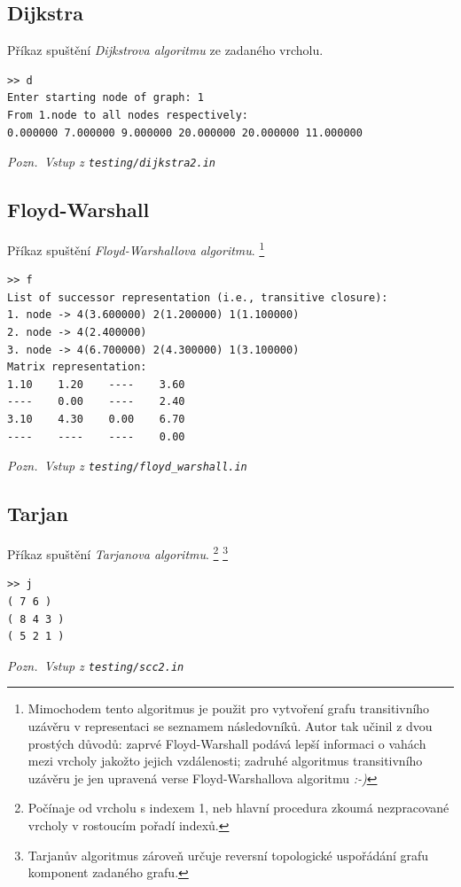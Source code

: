 \documentclass[11pt,a4paper]{article}
\begin{document}
\subsection{Dijkstra}
Příkaz spuštění {\sl Dijkstrova algoritmu\/} ze zadaného vrcholu.

\begin{verbatim}
>> d
Enter starting node of graph: 1
From 1.node to all nodes respectively:
0.000000 7.000000 9.000000 20.000000 20.000000 11.000000 
\end{verbatim}

{\noindent \sl Pozn.~Vstup z \tt testing/dijkstra2.in}

\subsection{Floyd-Warshall}
Příkaz spuštění {\sl Floyd-Warshallova algoritmu\/}.%
\footnote{Mimochodem tento algoritmus je použit pro vytvoření grafu
transitivního uzávěru v representaci se seznamem následovníků.
Autor tak učinil z dvou prostých důvodů: zaprvé Floyd-Warshall podává lepší
informaci o vahách mezi vrcholy jakožto jejich vzdálenosti; zadruhé algoritmus
transitivního uzávěru je jen upravená verse Floyd-Warshallova algoritmu \sl :-)}


\begin{verbatim}
>> f
List of successor representation (i.e., transitive closure):
1. node -> 4(3.600000) 2(1.200000) 1(1.100000)
2. node -> 4(2.400000)
3. node -> 4(6.700000) 2(4.300000) 1(3.100000)
Matrix representation:
1.10    1.20    ----    3.60
----    0.00    ----    2.40
3.10    4.30    0.00    6.70
----    ----    ----    0.00
\end{verbatim}

{\noindent \sl Pozn.~Vstup z \tt testing/floyd\_warshall.in}

\subsection{Tarjan}
Příkaz spuštění {\sl Tarjanova algoritmu\/}.%
\footnote{Počínaje od vrcholu s indexem 1, neb hlavní procedura zkoumá
  nezpracované vrcholy v rostoucím pořadí indexů.}%
\footnote{Tarjanův algoritmus zároveň určuje reversní topologické uspořádání
  grafu komponent zadaného grafu.}

\begin{verbatim}
>> j
( 7 6 )
( 8 4 3 )
( 5 2 1 )
\end{verbatim}

{\noindent \sl Pozn.~Vstup z \tt testing/scc2.in}
\end{document}
